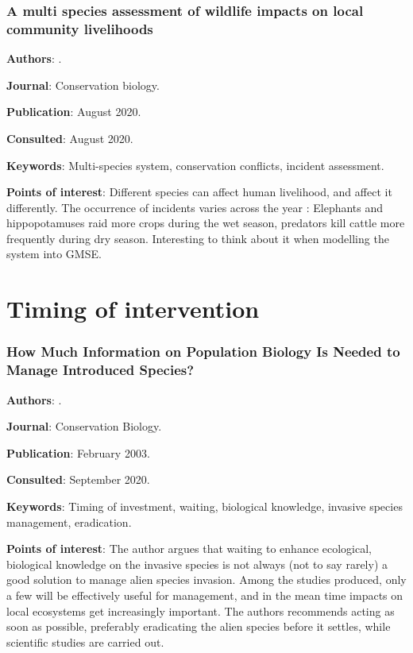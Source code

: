 \documentclass[12pt,a4paper]{article}
\begin{document}
\newpage

\subsubsection*{A multi species assessment of wildlife impacts on local community livelihoods}

\textbf{Authors}: \cite{pozo2020multispecies}.

\textbf{Journal}: Conservation biology.

\textbf{Publication}: August 2020.

\textbf{Consulted}: August 2020.

\textbf{Keywords}: Multi-species system, conservation conflicts, incident assessment.

\textbf{Points of interest}: Different species can affect human livelihood, and affect it differently. The occurrence of incidents varies across the year : Elephants and hippopotamuses raid more crops during the wet season, predators kill cattle more frequently during dry season. Interesting to think about it when modelling the system into GMSE.

\newpage

\section*{Timing of intervention}

\subsubsection*{How Much Information on Population Biology Is Needed to Manage Introduced Species?}

\textbf{Authors}: \cite{simberloff2003information}.

\textbf{Journal}: Conservation Biology.

\textbf{Publication}: February 2003.

\textbf{Consulted}: September 2020.

\textbf{Keywords}: Timing of investment, waiting, biological knowledge, invasive species management, eradication.

\textbf{Points of interest}: The author argues that waiting to enhance ecological, biological knowledge on the invasive species is not always (not to say rarely) a good solution to manage alien species invasion. Among the studies produced, only a few will be effectively useful for management, and in the mean time impacts on local ecosystems get increasingly important. The authors recommends acting as soon as possible, preferably eradicating the alien species before it settles, while scientific studies are carried out.
\end{document}
